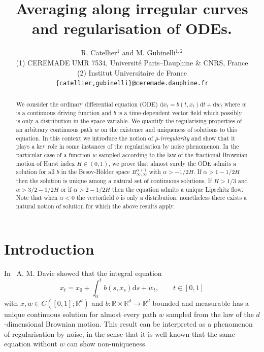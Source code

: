 \documentclass[a4paper,11pt]{article}
\newcommand{\mathd}{\mathrm{d}}
\newcommand{\tmtextit}[1]{{\itshape{#1}}}
\newcommand{\RR}{\mathbb R}
\begin{document}
\title{
  Averaging along irregular curves\\
  and regularisation of ODEs.
}

\author{  R. Catellier$^{1}$ and
  M. Gubinelli$^{1,2}$
\\[.1cm] {\small 
(1) CEREMADE  UMR 7534,  Universit\'e Paris--Dauphine \& CNRS, France
}
\\ {\small
(2) Institut Universitaire de France
}
\\ {\small \texttt{\{catellier,gubinelli\}@ceremade.dauphine.fr} }
}

\maketitle

\begin{abstract}
  We consider the ordinary differential equation (ODE) $\mathd x_{t} =b
  (t,x_{t} ) \mathd t+ \mathd w_{t}$ where $w$ is a continuous driving
  function and $b$ is a time-dependent vector field which possibly is only a
  distribution in the space variable. We quantify the regularising properties
  of an arbitrary continuous path $w$ on the existence and uniqueness of
  solutions to this equation. In this context we introduce the notion of
  $\rho$-\tmtextit{irregularity} and show that it plays a key role in some
  instances of the regularisation by noise phenomenon. In the particular case
  of a function $w$ sampled according to the law of the fractional Brownian
  motion of Hurst index $H \in (0,1)$, we prove that almost surely the ODE
  admits a solution for all $b$ in the Besov-H\"older space $B^{\alpha
  +1}_{\infty , \infty}$ with $\alpha >-1/2H$. If $\alpha >1-1/2H$ then the
  solution is unique among a natural set of continuous solutions. If $H>1/3$
  and $\alpha >3/2-1/2H$ or if $\alpha >2-1/2H$ then the equation admits a
  unique Lipschitz flow. Note that when $\alpha <0$ the vectorfield $b$ is
  only a distribution, nonetheless there exists a natural notion of solution
  for which the above results apply.
  
  
\end{abstract}

\tableofcontents

\section{Introduction}\label{sec:intro}

In~{\cite{MR2377011}} A. M. Davie showed that the integral equation
\begin{equation}
  \label{eq:ODE-0} x_{t} =x_{0} + \int_{0}^{t} b (s,x_{s} ) \mathd s+w_{t} ,
  \hspace{2em} t \in [0,1]
\end{equation}
with $x,w \in C ([0,1]; \RR^{d} )$ and $b: \RR \times \RR^{d} \to \RR^{d}$
bounded and measurable has a unique continuous solution for almost every path
$w$ sampled from the law of the $d$-dimensional Brownian motion. This result
can be interpreted as a phenomenon of regularisation by noise, in the sense
that it is well known that the same equation without $w$ can show
non-uniqueness.
\end{document}
